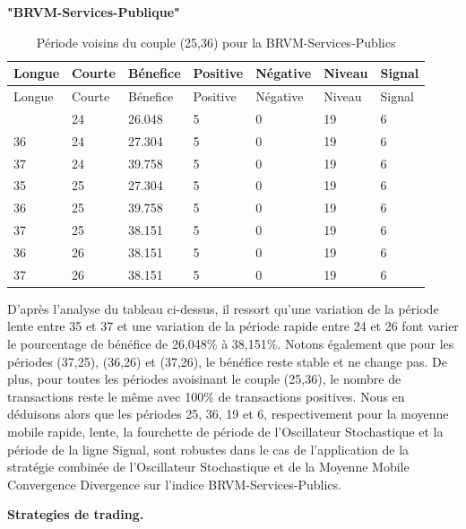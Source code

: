 \begin{itemize}
\begin{itemize}
    \textbf{"BRVM-Services-Publique"}

    \begin{longtable}[]{@{}lllllll@{}}
    \caption{Période voisins du couple (25,36) pour la
    BRVM-Services-Publics}\tabularnewline
    \toprule\noalign{}
    Longue & Courte & Bénefice & Positive & Négative & Niveau &
    Signal \\
    \midrule\noalign{}
    \endfirsthead
    \toprule\noalign{}
    Longue & Courte & Bénefice & Positive & Négative & Niveau &
    Signal \\
    \midrule\noalign{}
    \endhead
    \bottomrule\noalign{}
    \endlastfoot
    35 & 24 & 26.048 & 5 & 0 & 19 & 6 \\
    36 & 24 & 27.304 & 5 & 0 & 19 & 6 \\
    37 & 24 & 39.758 & 5 & 0 & 19 & 6 \\
    35 & 25 & 27.304 & 5 & 0 & 19 & 6 \\
    36 & 25 & 39.758 & 5 & 0 & 19 & 6 \\
    37 & 25 & 38.151 & 5 & 0 & 19 & 6 \\
    36 & 26 & 38.151 & 5 & 0 & 19 & 6 \\
    37 & 26 & 38.151 & 5 & 0 & 19 & 6 \\
    \end{longtable}

    {D'après l'analyse du tableau ci-dessus, il ressort qu'une variation
    de la période lente entre 35 et 37 et une variation de la période
    rapide entre 24 et 26 font varier le pourcentage de bénéfice de
    26,048\% à 38,151\%. Notons également que pour les périodes (37,25),
    (36,26) et (37,26), le bénéfice reste stable et ne change pas. De
    plus, pour toutes les périodes avoisinant le couple (25,36), le
    nombre de transactions reste le même avec 100\% de transactions
    positives. Nous en déduisons alors que les périodes 25, 36, 19 et 6,
    respectivement pour la moyenne mobile rapide, lente, la fourchette
    de période de l'Oscillateur Stochastique et la période de la ligne
    Signal, sont robustes dans le cas de l'application de la stratégie
    combinée de l'Oscillateur Stochastique et de la Moyenne Mobile
    Convergence Divergence sur l'indice BRVM-Services-Publics.}
  \end{itemize}
\end{itemize}

\textbf{Strategies de trading.}


